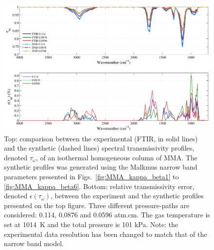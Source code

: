 \begin{figure}[p]
\includegraphics[width=\textwidth]{Figures/Comparison_Fit_MMA_MALKMUS_Temp1014K.pdf}
\caption{Top: comparison between the experimental (FTIR, in solid lines) and the synthetic (dashed lines) spectral transmissivity profiles, denoted $\tau_{\omega}$, of an isothermal homogeneous column of MMA. The synthetic profiles was generated using the Malkmus narrow band parameters presented in Figs.~\ref{fig:MMA_kappa_beta1} to \ref{fig:MMA_kappa_beta6}. Bottom: relative transmissivity error, denoted $\epsilon{(\tau_{\omega})}$, between the experiment and the synthetic profiles presented on the top figure. Three different pressure-paths are considered: 0.114, 0.0876 and 0.0596 atm.cm. The gas temperature is set at 1014~K and the total pressure is 101 kPa. Note: the experimental data resolution has been changed to match that of the narrow band model. \label{fig:MMA_SNBVerify_1014K}}
\end{figure}
